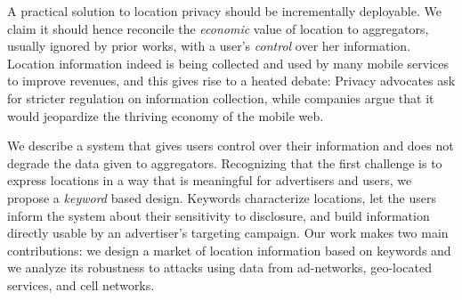 A practical solution to location privacy should be incrementally deployable. We claim it should hence reconcile the \emph{economic} value of location to aggregators, usually ignored by prior works, with a user's \emph{control} over her information.
Location information indeed is being collected and used by many mobile services to improve revenues, and this gives rise to a heated debate: Privacy advocates ask for stricter regulation on information collection, while companies argue that it would jeopardize the thriving economy of the mobile web. 

We describe a system that gives users control over their information and does not degrade the data given to aggregators. 
Recognizing that the first challenge is to express locations in a way that is meaningful for advertisers and users, we propose a \emph{keyword} based design. 
Keywords characterize locations, let the users inform the system about their sensitivity to disclosure, and build information directly usable by an advertiser's targeting campaign. 
Our work makes two main contributions: we design a market of location information based on keywords and we analyze its robustness to attacks using data from ad-networks, geo-located services, and cell networks.



